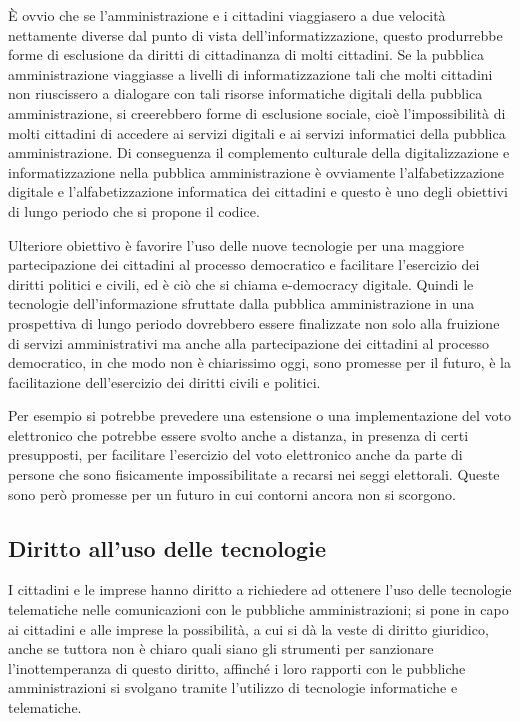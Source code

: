 È ovvio che se l'amministrazione e i cittadini viaggiasero a due velocità nettamente diverse dal punto di vista dell'informatizzazione, questo produrrebbe forme di esclusione da diritti di cittadinanza di molti cittadini. Se la pubblica amministrazione viaggiasse a livelli di informatizzazione tali che molti cittadini non riuscissero a dialogare con tali risorse informatiche digitali della pubblica amministrazione, si creerebbero forme di esclusione sociale, cioè l'impossibilità di molti cittadini di accedere ai servizi digitali e ai servizi informatici della pubblica amministrazione. Di conseguenza il complemento culturale della digitalizzazione e informatizzazione nella pubblica amministrazione è ovviamente l'alfabetizzazione digitale e l'alfabetizzazione informatica dei cittadini e questo è uno degli obiettivi di lungo periodo che si propone il codice. 

Ulteriore obiettivo è favorire l'uso delle nuove tecnologie per una maggiore partecipazione dei cittadini al processo democratico e facilitare l'esercizio dei diritti politici e civili, ed è ciò che si chiama e-democracy digitale.
Quindi le tecnologie dell'informazione sfruttate dalla pubblica amministrazione in una prospettiva di lungo periodo dovrebbero essere finalizzate non solo alla fruizione di servizi amministrativi ma anche alla partecipazione dei cittadini al processo democratico, in che modo non è chiarissimo oggi, sono promesse per il futuro, è la facilitazione dell'esercizio dei diritti civili e politici. 

Per esempio si potrebbe prevedere una estensione o una implementazione del voto elettronico che potrebbe essere svolto anche a distanza, in presenza di certi presupposti, per facilitare l'esercizio del voto elettronico anche da parte di persone che sono fisicamente impossibilitate a recarsi nei seggi elettorali.
Queste sono però promesse per un futuro in cui contorni ancora non si scorgono. 

\subsection{Diritto all'uso delle tecnologie}

I cittadini e le imprese hanno diritto a richiedere ad ottenere l'uso delle tecnologie telematiche nelle comunicazioni con le pubbliche amministrazioni; si pone in capo ai cittadini e alle imprese la possibilità, a cui si dà la veste di diritto giuridico, anche se tuttora non è chiaro quali siano gli strumenti per sanzionare l'inottemperanza di questo diritto, affinché i loro rapporti con le pubbliche amministrazioni si svolgano tramite l'utilizzo di tecnologie informatiche e telematiche. 

